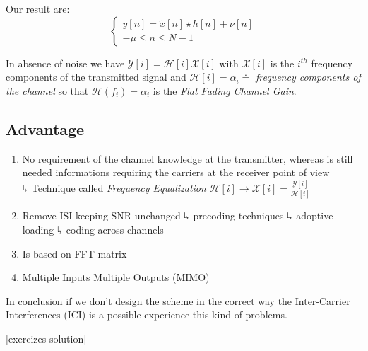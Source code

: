 Our result are:
\begin{equation}
\begin{cases}
y[n] = \widetilde{x}[n] \star h[n] + \nu[n]\\
-\mu \leq n \leq N - 1
\end{cases}
\end{equation}

In absence of noise we have $\mathcal{Y}[i] = \mathcal{H}[i]\mathcal{X}[i]$ with $\mathcal{X}[i]$ is the $i^{th}$ frequency components of the transmitted signal and $\mathcal{H}[i] = \alpha_i \doteq$ \textit{frequency components of the channel} so that $\mathcal{H}(f_i) = \alpha_i$ is the \emph{Flat Fading Channel Gain}.

\subsection{Advantage}
\begin{enumerate}
\item No requirement of the channel knowledge at the transmitter, whereas is still needed informations requiring the carriers at the receiver point of view\\
$\rotatebox[origin=c]{180}{$\Lsh$}$ Technique called \emph{Frequency Equalization} $\mathcal{H}[i] \rightarrow \mathcal{X}[i] = \frac{\mathcal{Y}[i]}{\mathcal{H}[i]}$
\item Remove ISI keeping SNR unchanged
$\rotatebox[origin=c]{180}{$\Lsh$}$ precoding techniques
$\rotatebox[origin=c]{180}{$\Lsh$}$ adoptive loading
$\rotatebox[origin=c]{180}{$\Lsh$}$ coding across channels
\item Is based on FFT matrix
\item Multiple Inputs Multiple Outputs (MIMO)
\end{enumerate}

In conclusion if we don't design the scheme in the correct way the Inter-Carrier Interferences (ICI) is a possible experience this kind of problems.

[exercizes solution]

